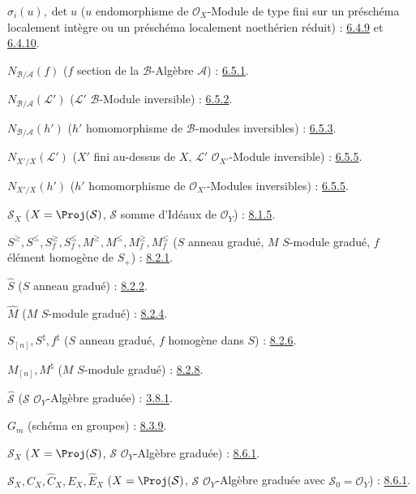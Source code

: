 $\sigma_i(u),\det u$
($u$ endomorphisme de $\mathcal{O}_X$-Module de type fini sur un préschéma
localement intègre ou un préschéma localement noethérien réduit) :
\hyperref[II.6.4.9-fr]{6.4.9} et \hyperref[II.6.4.10-fr]{6.4.10}.

$N_{\mathcal{B}/\mathcal{A}}(f)$
($f$ section de la $\mathcal{B}$-Algèbre $\mathcal{A}$) : \hyperref[II.6.5.1-fr]{6.5.1}.

$N_{\mathcal{B}/\mathcal{A}}(\mathcal{L}')$
($\mathcal{L}'$ $\mathcal{B}$-Module inversible) : \hyperref[II.6.5.2-fr]{6.5.2}.

$N_{\mathcal{B}/\mathcal{A}}(h')$
($h'$ homomorphisme de $\mathcal{B}$-modules inversibles) : \hyperref[II.6.5.3-fr]{6.5.3}.

$N_{X'/X}(\mathcal{L}')$
($X'$ fini au-dessus de $X$, $\mathcal{L}'$ $\mathcal{O}_{X'}$-Module inversible) : \hyperref[II.6.5.5-fr]{6.5.5}.

$N_{X'/X}(h')$
($h'$ homomorphisme de $\mathcal{O}_{X'}$-Modules inversibles) : \hyperref[II.6.5.5-fr]{6.5.5}.

$\mathcal{S}_X$ ($X=\Proj(\mathcal{S})$, $\mathcal{S}$ somme d'Idéaux de
$\mathcal{O}_Y$) : \hyperref[II.8.1.5-fr]{8.1.5}.

$S^\geq,S^\leq,S_f^\geq,S_f^\leq,
M^\geq,M^\leq,M_f^\geq,M_f^\leq$
($S$ anneau gradué, $M$ $S$-module gradué,
$f$ élément homogène de $S_+$) : \hyperref[II.8.2.1-fr]{8.2.1}.

$\widehat S$ ($S$ anneau gradué) : \hyperref[II.8.2.2-fr]{8.2.2}.

$\widehat M$ ($M$ $S$-module gradué) : \hyperref[II.8.2.4-fr]{8.2.4}.

$S_{[n]},S^\natural,f^\natural$
($S$ anneau gradué, $f$ homogène dans $S$) : \hyperref[II.8.2.6-fr]{8.2.6}.

$M_{[n]},M^\natural$ ($M$ $S$-module gradué) : \hyperref[II.8.2.8-fr]{8.2.8}.

$\widehat{\mathcal{S}}$ ($\mathcal{S}$ $\mathcal{O}_Y$-Algèbre graduée) : \hyperref[II.8.3.1-fr]{3.8.1}.

$G_m$ (schéma en groupes) : \hyperref[II.8.3.9-fr]{8.3.9}.

$\mathcal{S}_X$ ($X=\Proj(\mathcal{S})$, $\mathcal{S}$ $\mathcal{O}_Y$-Algèbre graduée) : \hyperref[II.8.6.1-fr]{8.6.1}.

$\mathcal{S}_X,C_X,\widehat C_X,E_X,\widehat E_X$
($X=\Proj(\mathcal{S})$, $\mathcal{S}$ $\mathcal{O}_Y$-Algèbre graduée
avec $\mathcal{S}_0=\mathcal{O}_Y$) : \hyperref[II.8.6.1-fr]{8.6.1}.

